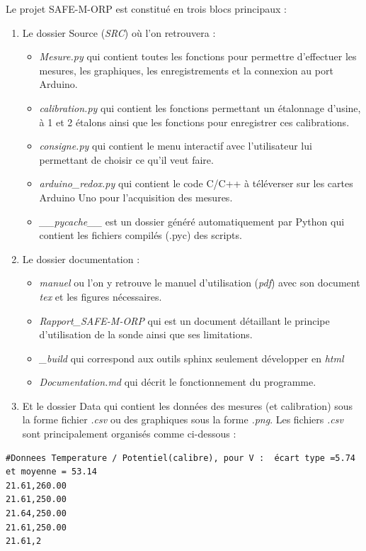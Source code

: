 \documentclass{ipgplicence}
\begin{document}
Le projet SAFE-M-ORP est constitué en trois blocs principaux : 
\begin{enumerate}
    \item Le dossier Source (\textit{SRC}) où l'on retrouvera : 
    \begin{itemize}
        \item \textit{Mesure.py} qui contient toutes les fonctions pour permettre d'effectuer les mesures, les graphiques, les enregistrements et la connexion au port Arduino.
        \item \textit{calibration.py} qui contient les fonctions permettant un étalonnage d'usine, à 1 et 2 étalons ainsi que les fonctions pour enregistrer ces calibrations. 
        \item \textit{consigne.py} qui contient le menu interactif avec l'utilisateur lui permettant de choisir ce qu'il veut faire. 
        \item \textit{arduino\_redox.py} qui contient le code C/C++ à téléverser sur les cartes Arduino Uno pour  
        l'acquisition des mesures. 
        \item \textit{\_\_pycache\_\_} est un dossier généré automatiquement par Python qui contient les fichiers compilés (.pyc) des scripts.
    \end{itemize}

    \item Le dossier documentation :
    \begin{itemize}
        \item \textit{manuel} ou l'on y retrouve le manuel d'utilisation (\textit{pdf}) avec son document \textit{tex} et les figures nécessaires.
        \item \textit{Rapport\_SAFE-M-ORP} qui est un document détaillant le principe d'utilisation de la sonde ainsi que ses limitations.
        \item \textit{\_build} qui correspond aux outils sphinx seulement développer en \textit{html}
        \item \textit{Documentation.md} qui décrit le fonctionnement du programme.
    \end{itemize}

    \item Et le dossier Data qui contient les données des mesures (et calibration) sous la forme fichier \textit{.csv} ou des graphiques sous la forme \textit{.png}. 
    Les fichiers \textit{.csv} sont principalement organisés comme ci-dessous : 
\end{enumerate}
\begin{verbatim}
#Donnees Temperature / Potentiel(calibre), pour V :  écart type =5.74 et moyenne = 53.14
21.61,260.00
21.61,250.00
21.64,250.00
21.61,250.00
21.61,2
\end{verbatim}
\newpage
\end{document}
